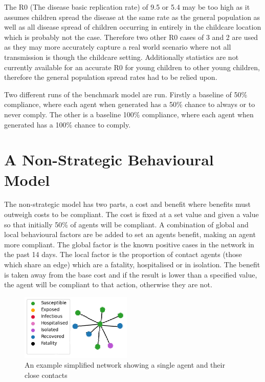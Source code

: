 \documentclass{article}
\begin{document}
The R0 (The disease basic replication rate) of 9.5 or 5.4 may be too high as it assumes children spread the disease at the same rate as the general population as well as all disease spread of children occurring in entirely in the childcare location which is probably not the case. Therefore two other R0 cases of 3 and 2 are used as they may more accurately capture a real world scenario where not all transmission is though the childcare setting. Additionally statistics are not currently available for an accurate R0 for young children to other young children, therefore the general population spread rates had to be relied upon. \newline

Two different runs of the benchmark model are run. Firstly a baseline of 50\% compliance, where each agent when generated has a 50\% chance to always or to never comply. The other is a baseline 100\% compliance, where each agent when generated has a 100\% chance to comply. 


\section{A Non-Strategic Behavioural Model}
The non-strategic model has two parts, a cost and benefit where benefits must outweigh costs to be compliant. 
The cost is fixed at a set value and given a value so that initially 50\% of agents will be compliant. 
A combination of global and local behavioural factors are be added to set an agents benefit, making an agent more compliant.
The global factor is the known positive cases in the network in the past 14 days. 
The local factor is the proportion of contact agents (those which share an edge) which are a fatality, hospitalised or in isolation. 
The benefit is taken away from the base cost and if the result is lower than a specified value, the agent will be compliant to that action, otherwise they are not.\newline

\begin{figure}[h!]
\centering
\includegraphics[width =150pt]{basicnet}
\caption{An example simplified network showing a single agent and their close contacts}
\end{figure}
\end{document}
